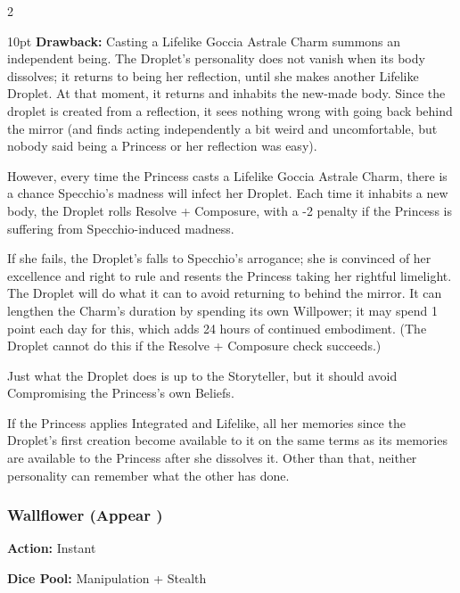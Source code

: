 \begin{multicols}{2}
\begin{myindentpar}{10pt}
\textbf{Drawback:} Casting a Lifelike Goccia Astrale Charm summons an independent being. The Droplet's personality does not vanish when its body dissolves; it returns to being her reflection, until she makes another Lifelike Droplet. At that moment, it returns and inhabits the new-made body. Since the droplet is created from a reflection, it sees nothing wrong with going back behind the mirror (and finds acting independently a bit weird and uncomfortable, but nobody said being a Princess or her reflection was easy). 

However, every time the Princess casts a Lifelike Goccia Astrale Charm, there is a chance Specchio's madness will infect her Droplet. Each time it inhabits a new body, the Droplet rolls Resolve + Composure, with a -2 penalty if the Princess is suffering from Specchio-induced madness. 

If she fails, the Droplet's falls to Specchio's arrogance; she is convinced of her excellence and right to rule and resents the Princess taking her rightful limelight. The Droplet will do what it can to avoid returning to behind the mirror. It can lengthen the Charm's duration by spending its own Willpower; it may spend 1 point each day for this, which adds 24 hours of continued embodiment. (The Droplet cannot do this if the Resolve + Composure check succeeds.) 

Just what the Droplet does is up to the Storyteller, but it should avoid Compromising the Princess's own Beliefs.

If the Princess applies Integrated and Lifelike, all her memories since the Droplet's first creation become available to it on the same terms as its memories are available to the Princess after she dissolves it. Other than that, neither personality can remember what the other has done.\end{myindentpar}

\subsubsection*{Wallflower (Appear \textbullet\textbullet\textbullet)}
\noindent \textbf{Action:} Instant

\noindent \textbf{Dice Pool:} Manipulation + Stealth


\end{multicols}
